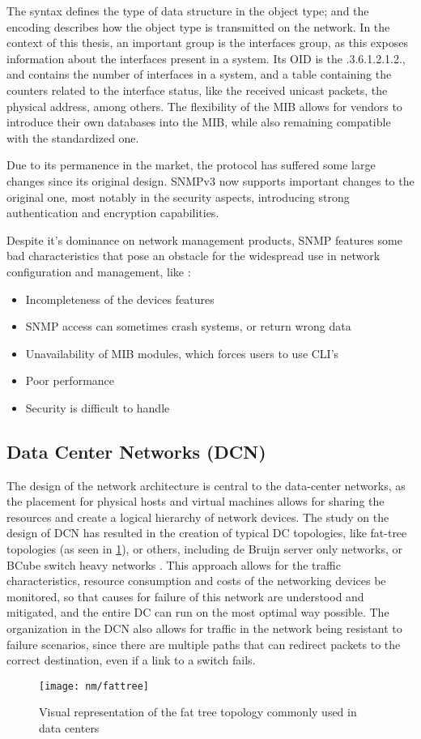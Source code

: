 \par The syntax defines the type of data structure in the object type; and the encoding describes how the object type is transmitted on the network. In the context
of this thesis, an important group is the interfaces group, as this exposes information about the interfaces present in a system. Its OID is the .3.6.1.2.1.2., 
and contains the number of interfaces in a system, and a table containing the counters related to the interface status, like the received unicast packets, the 
physical address, among others. The flexibility of the MIB allows for vendors to introduce their own databases into the MIB, while also remaining compatible 
with the standardized one.

\par Due to its permanence in the market, the protocol has suffered some large changes since its original design. SNMPv3 now supports important changes to the
original one, most notably in the security aspects, introducing strong authentication and encryption capabilities.

\par Despite it's dominance on network management products, SNMP features some bad characteristics that pose an obstacle for the widespread use in network
configuration and management, like \cite{schonwalder_overview_2003}: 

\begin {itemize}
    \item Incompleteness of the devices features
    \item SNMP access can sometimes crash systems, or return wrong data
    \item Unavailability of MIB modules, which forces users to use CLI's
    \item Poor performance 
    \item Security is difficult to handle
\end {itemize}

\subsection {Data Center Networks (DCN)}

\par The design of the network architecture is central to the data-center networks, as the placement for physical hosts and virtual machines allows for sharing the 
resources and create a logical hierarchy of network devices. The study on the design of DCN has resulted in the creation of typical DC topologies, like fat-tree
topologies (as seen in \ref{fig:fattree}), or others, including de Bruijn server only networks, or BCube switch heavy networks \cite{popa_cost_2010}. This approach
allows for the traffic characteristics, resource consumption and costs of the networking devices be monitored, so that causes for failure of this network are
understood and mitigated, and the entire DC can run on the most optimal way possible. The organization in the DCN also allows for traffic in the network being
resistant to failure scenarios, since there are multiple paths that can redirect packets to the correct destination, even if a link to a switch fails.

\begin{figure} [H]
    \centering
    \texttt{[image: nm/fattree]}
    \caption{Visual representation of the fat tree topology commonly used in data centers}
    \label{fig:fattree}
\end{figure}

